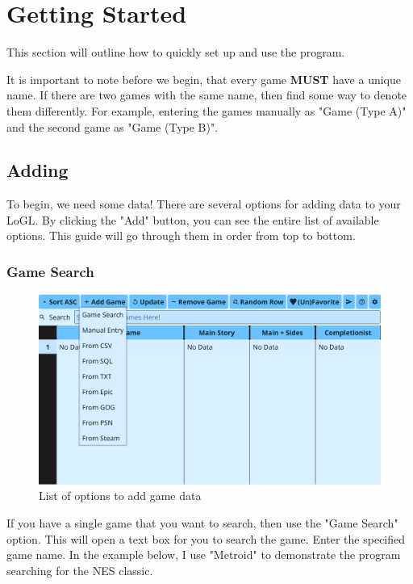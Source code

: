 \section{Getting Started}

This section will outline how to quickly set up and use the program.

It is important to note before we begin, that every game
\textbf{MUST} have a unique
name. If there are two games with the same name, then find some way
to denote them differently. For example, entering the games manually
as "Game (Type A)" and the second game as "Game (Type B)".

\subsection{Adding}

To begin, we need some data! There are several options for adding
data to your LoGL. By clicking the "Add" button, you can see the
entire list of available options. This guide will go through them in
order from top to bottom.

\subsubsection{Game Search}

\begin{figure}[htb]
	\centering
	\includegraphics[width=14cm]{./Images/AddOpts.png}
	\caption{List of options to add game data}
	\label{fig:AddOpts}
\end{figure}

If you have a single game that you want to search, then use the "Game
Search" option. This will open a text box for you to search the game.
Enter the specified game name. In the example below, I use "Metroid"
to demonstrate the program searching for the NES classic.

